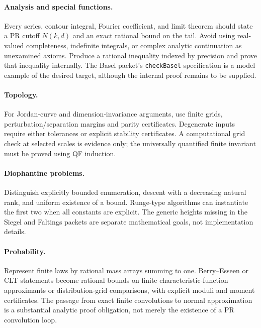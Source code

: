 \documentclass[11pt]{article}
\begin{document}
\paragraph{Analysis and special functions.} Every series, contour integral, Fourier coefficient, and limit theorem should state a PR cutoff $N(k,d)$ and an exact rational bound on the tail. Avoid using real-valued completeness, indefinite integrals, or complex analytic continuation as unexamined axioms. Produce a rational inequality indexed by precision and prove that inequality internally. The Basel packet's \texttt{checkBasel} specification is a model example of the desired target, although the internal proof remains to be supplied.
\paragraph{Topology.} For Jordan-curve and dimension-invariance arguments, use finite grids, perturbation/separation margins and parity certificates. Degenerate inputs require either tolerances or explicit stability certificates. A computational grid check at selected scales is evidence only; the universally quantified finite invariant must be proved using QF induction.
\paragraph{Diophantine problems.} Distinguish explicitly bounded enumeration, descent with a decreasing natural rank, and uniform existence of a bound. Runge-type algorithms can instantiate the first two when all constants are explicit. The generic heights missing in the Siegel and Faltings packets are separate mathematical goals, not implementation details.
\paragraph{Probability.} Represent finite laws by rational mass arrays summing to one. Berry--Esseen or CLT statements become rational bounds on finite characteristic-function approximants or distribution-grid comparisons, with explicit moduli and moment certificates. The passage from exact finite convolutions to normal approximation is a substantial analytic proof obligation, not merely the existence of a PR convolution loop.
\end{document}
